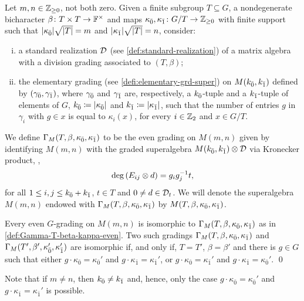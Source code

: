 \begin{defi}\label{def:Gamma-T-beta-kappa-even}
    Let $m, n\in \mathbb{Z}_{\geq 0}$, not both zero. 
    Given a finite subgroup $T \subseteq G$, a nondegenerate bicharacter $\beta\colon T\times T \to \mathbb{F}^\times$ and maps $\kappa_{\bar{0}}, \kappa_{\bar{1}} \colon G/T \to \mathbb{Z}_{\geq 0}$ with finite support such that $|\kappa_{\bar{0}}| \sqrt{|T|} = m$ and $|\kappa_{\bar{1}}| \sqrt{|T|} = n$, consider:
    \begin{enumerate}[(i)]
        \item a standard realization $\mathcal{D}$ (see \cref{def:standard-realization}) of a matrix algebra with a division grading associated to $(T,\beta)$;
        \item the elementary grading (see \cref{defi:elementary-grd-super}) on $M(k_{\bar{0}}, k_{\bar{1}})$ defined by $(\gamma_{\bar{0}}, \gamma_{\bar{1}})$, where $\gamma_{\bar{0}}$ and $\gamma_{\bar{1}}$ are, respectively, a $k_{\bar{0}}$-tuple and a $k_{\bar{1}}$-tuple of elements of $G$, $k_{\bar{0}} \coloneqq |\kappa_{\bar{0}}|$ and $k_{\bar{1}} \coloneqq |\kappa_{\bar{1}}|$, such that the number of entries $g$ in $\gamma_i$ with $g\in x$ is equal to $\kappa_i (x)$, for every $i\in \mathbb{Z}_2$ and $x\in G/T$.
    \end{enumerate}
    We define $\Gamma_M (T, \beta, \kappa_{\bar{0}}, \kappa_{\bar{1}})$ to be the even grading on $M(m,n)$ given by identifying $M(m,n)$ with the graded superalgebra $M(k_{\bar{0}}, k_{\bar{1}}) \otimes \mathcal{D}$ via Kronecker product, \ie,
    \[
        \deg \left( E_{ij} \otimes d \right) = g_ig_j^{-1} t,
    \] 
    for all $1\leq i, j \leq k_{\bar{0}} + k_{\bar{1}}$, $t\in T$ and $0 \neq d \in \mathcal{D}_t$. 
    We will denote the superalgebra $M(m,n)$ endowed with $\Gamma_M (T, \beta, \kappa_{\bar{0}}, \kappa_{\bar{1}})$ by $M(T, \beta, \kappa_{\bar{0}}, \kappa_{\bar{1}})$. 
\end{defi}

\begin{cor}\label{cor:iso-M-even}
    Every even $G$-grading on $M(m,n)$ is isomorphic to $\Gamma_M (T, \beta, \kappa_{\bar{0}}, \kappa_{\bar{1}})$ as in \cref{def:Gamma-T-beta-kappa-even}. 
    Two such gradings $\Gamma_M (T, \beta, \kappa_{\bar{0}}, \kappa_{\bar{1}})$ and $\Gamma_M (T', \beta', \kappa_{\bar{0}}', \kappa_{\bar{1}}')$ are isomorphic if, and only if, $T = T'$, $\beta = \beta'$ and there is $g\in G$ such that either $g \cdot \kappa_{\bar 0}=\kappa_{\bar 0}'$ and $g \cdot \kappa_{\bar 1}=\kappa_{\bar 1}'$, or $g \cdot \kappa_{\bar 0}=\kappa_{\bar 1}'$ and $g \cdot \kappa_{\bar 1}=\kappa_{\bar 0}'$.  \qed
\end{cor}

Note that if $m \neq n$, 
then $k_{\bar{0}} \neq k_{\bar{1}}$ and, hence, only the case $g \cdot \kappa_{\bar 0}=\kappa_{\bar 0}'$ and $g \cdot \kappa_{\bar 1}=\kappa_{\bar 1}'$ is possible.


